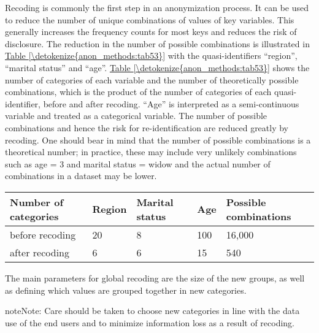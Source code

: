 \documentclass[letterpaper,10pt,english]{sphinxmanual}
\begin{document}
Recoding is commonly the first step in an anonymization process. It can
be used to reduce the number of unique combinations of values of key
variables. This generally increases the frequency counts for most keys
and reduces the risk of disclosure. The reduction in the number of
possible combinations is illustrated in \hyperref[\detokenize{anon_methods:tab53}]{Table \ref{\detokenize{anon_methods:tab53}}} with the
quasi-identifiers “region”, “marital status” and “age”. \hyperref[\detokenize{anon_methods:tab53}]{Table \ref{\detokenize{anon_methods:tab53}}} shows
the number of categories of each variable and the number of
theoretically possible combinations, which is the product of the number
of categories of each quasi-identifier, before and after recoding. “Age”
is interpreted as a semi-continuous variable and treated as a
categorical variable. The number of possible combinations and hence the
risk for re-identification are reduced greatly by recoding. One should
bear in mind that the number of possible combinations is a theoretical
number; in practice, these may include very unlikely combinations such
as age = 3 and marital status = widow and the actual number of
combinations in a dataset may be lower.


\begin{savenotes}\sphinxattablestart
\centering
{}
\label{\detokenize{anon_methods:tab53}}\label{\detokenize{anon_methods:id25}}
\sphinxaftercaption
\begin{tabulary}{\linewidth}[t]{|T|T|T|T|T|}
\hline
\sphinxstyletheadfamily 
Number of categories
&\sphinxstyletheadfamily 
Region
&\sphinxstyletheadfamily 
Marital status
&\sphinxstyletheadfamily 
Age
&\sphinxstyletheadfamily 
Possible combinations
\\
\hline
before recoding
&
20
&
8
&
100
&
16,000
\\
\hline
after recoding
&
6
&
6
&
15
&
540
\\
\hline
\end{tabulary}
\par
\sphinxattableend\end{savenotes}

The main parameters for global recoding are the size of the new groups,
as well as defining which values are grouped together in new categories.

\begin{sphinxadmonition}{note}{Note:}
Care should be taken to choose new categories in line with the
data use of the end users and to minimize information loss as a result
of recoding.
\end{sphinxadmonition}
\end{document}
